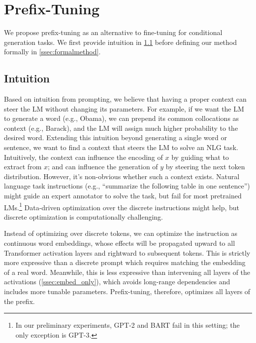 \documentclass[11pt,a4paper]{article}
\newcommand\pl[1]{\textcolor{red}{[PL: #1]}}
\newcommand\lisa[1]{\textcolor{blue}{[Lisa: #1]}}
\begin{document}
\section{Prefix-Tuning}

We propose prefix-tuning as an alternative to fine-tuning for conditional generation tasks. We first provide intuition in \cref{ssec:intuition} before defining our method formally in \cref{ssec:formalmethod}.

\subsection{Intuition} 
\label{ssec:intuition}
Based on intuition from prompting, we believe that having a proper context can steer the LM without changing its parameters. For example, if we want the LM to generate a word (e.g., Obama), we can prepend its common collocations as context (e.g., Barack), and the LM will assign much higher probability to the desired word.
Extending this intuition beyond generating a single word or sentence, we want to find a context that steers the LM to solve an NLG task. Intuitively, the context can influence the encoding of $x$ by guiding what to extract from $x$; and can influence the generation of $y$ by steering the next token distribution. However, it's non-obvious whether such a context exists. 
Natural language task instructions (e.g., ``summarize the following table in one sentence'') might guide an expert annotator to solve the task, but fail for most pretrained LMs.\footnote{In our preliminary experiments, GPT-2 and BART fail in this setting; the only exception is GPT-3. } Data-driven optimization over the discrete instructions might help, but discrete optimization is computationally challenging. 

Instead of optimizing over discrete tokens, we can optimize the instruction as continuous word embeddings, whose effects will be propagated upward to all Transformer activation layers and rightward to subsequent tokens. This is strictly more expressive than a discrete prompt which requires matching the embedding of a real word. Meanwhile, this is less expressive than intervening all layers of the activations (\cref{ssec:embed_only}), which avoids long-range dependencies and includes more tunable parameters. Prefix-tuning, therefore, optimizes all layers of the prefix. 
\end{document}
